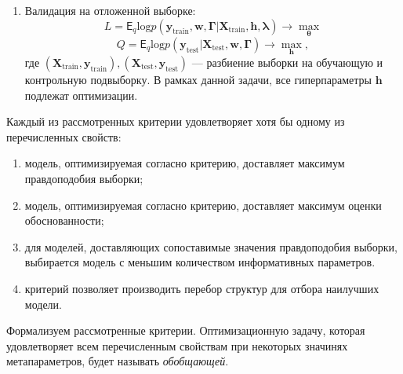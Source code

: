 \begin{enumerate}
\item Валидация на отложенной выборке:
\begin{equation}
\label{eq:optim_hold_out}
    L = \mathsf{E}_q \text{log}p(\mathbf{y}_\text{train}, \mathbf{w}, \boldsymbol{\Gamma}|\mathbf{X}_\text{train}, \mathbf{h}, \boldsymbol{\lambda}) \to \max_{\boldsymbol{\theta}}
\end{equation}
\[
    Q = \mathsf{E}_q \text{log}p(\mathbf{y}_\text{test}|\mathbf{X}_\text{test}, \mathbf{w}, \boldsymbol{\Gamma}) \to \max_{\mathbf{h}},
\]
где $(\mathbf{X}_\text{train}, \mathbf{y}_\text{train}), (\mathbf{X}_\text{test}, \mathbf{y}_\text{test})$ --- разбиение выборки на обучающую и контрольную подвыборку.
В рамках данной задачи, все гиперпараметры $\mathbf{h}$ подлежат оптимизации.

\end{enumerate}

Каждый из рассмотренных критерии удовлетворяет хотя бы одному из перечисленных свойств:
\begin{enumerate}
\item модель, оптимизируемая согласно критерию, доставляет максимум правдоподобия выборки;
\item модель, оптимизируемая согласно критерию, доставляет максимум оценки обоснованности;
\item для моделей, доставляющих сопоставимые значения правдоподобия выборки, выбирается модель с меньшим количеством информативных параметров.
\item критерий позволяет производить перебор структур для отбора наилучших модели.
\end{enumerate}

Формализуем рассмотренные критерии. Оптимизационную задачу, которая удовлетворяет всем перечисленным свойствам при некоторых значинях метапараметров, будет называть \textit{обобщающей}.

